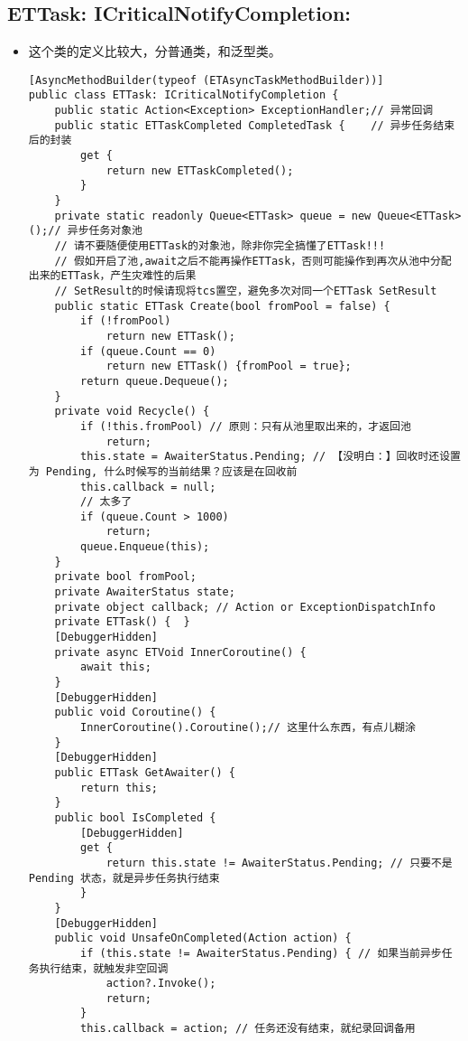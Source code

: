 \documentclass[9pt, b5paper]{article}
\begin{document}
\subsection{ETTask: ICriticalNotifyCompletion:}
\label{sec-11-4}
\begin{itemize}
\item 这个类的定义比较大，分普通类，和泛型类。
\begin{verbatim}
[AsyncMethodBuilder(typeof (ETAsyncTaskMethodBuilder))]
public class ETTask: ICriticalNotifyCompletion {
    public static Action<Exception> ExceptionHandler;// 异常回调
    public static ETTaskCompleted CompletedTask {    // 异步任务结束后的封装
        get {
            return new ETTaskCompleted();
        }
    }
    private static readonly Queue<ETTask> queue = new Queue<ETTask>();// 异步任务对象池
    // 请不要随便使用ETTask的对象池，除非你完全搞懂了ETTask!!!
    // 假如开启了池,await之后不能再操作ETTask，否则可能操作到再次从池中分配出来的ETTask，产生灾难性的后果
    // SetResult的时候请现将tcs置空，避免多次对同一个ETTask SetResult
    public static ETTask Create(bool fromPool = false) {
        if (!fromPool) 
            return new ETTask();
        if (queue.Count == 0) 
            return new ETTask() {fromPool = true};    
        return queue.Dequeue();
    }
    private void Recycle() { 
        if (!this.fromPool) // 原则：只有从池里取出来的，才返回池
            return;
        this.state = AwaiterStatus.Pending; // 【没明白：】回收时还设置为 Pending, 什么时候写的当前结果？应该是在回收前
        this.callback = null;
        // 太多了
        if (queue.Count > 1000) 
            return;
        queue.Enqueue(this);
    }
    private bool fromPool;
    private AwaiterStatus state;
    private object callback; // Action or ExceptionDispatchInfo
    private ETTask() {  }
    [DebuggerHidden]
    private async ETVoid InnerCoroutine() {
        await this;
    }
    [DebuggerHidden]
    public void Coroutine() {
        InnerCoroutine().Coroutine();// 这里什么东西，有点儿糊涂
    }
    [DebuggerHidden]
    public ETTask GetAwaiter() {
        return this;
    }
    public bool IsCompleted {
        [DebuggerHidden]
        get {
            return this.state != AwaiterStatus.Pending; // 只要不是 Pending 状态，就是异步任务执行结束
        }
    }
    [DebuggerHidden]
    public void UnsafeOnCompleted(Action action) {
        if (this.state != AwaiterStatus.Pending) { // 如果当前异步任务执行结束，就触发非空回调
            action?.Invoke();
            return;
        }
        this.callback = action; // 任务还没有结束，就纪录回调备用

\end{verbatim}
\end{itemize}
\end{document}
